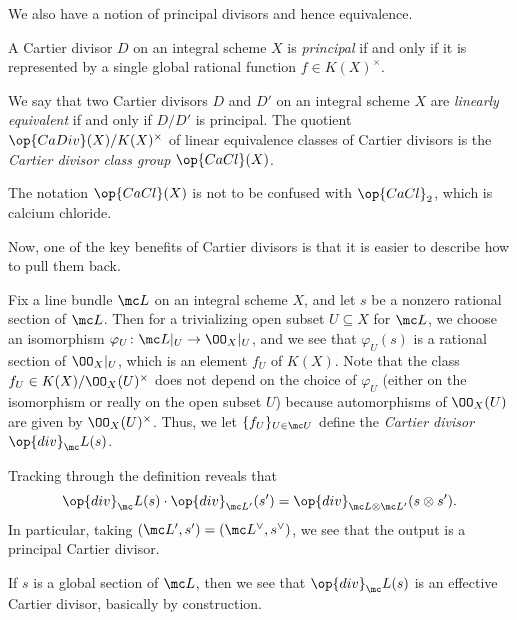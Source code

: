 \documentclass[../notes.tex]{subfiles}
\begin{document}
We also have a notion of principal divisors and hence equivalence.
\begin{defihelper}[principal] 
	A Cartier divisor $D$ on an integral scheme $X$ is \textit{principal} if and only if it is represented by a single global rational function $f\in K(X)^\times$.
\end{defihelper}
\begin{defihelper} 
	We say that two Cartier divisors $D$ and $D'$ on an integral scheme $X$ are \textit{linearly equivalent} if and only if $D/D'$ is principal. The quotient $\op{CaDiv}(X)/K(X)^\times$ of linear equivalence classes of Cartier divisors is the \textit{Cartier divisor class group} $\op{CaCl}(X)$.
\end{defihelper}
\begin{remark}[Vojta]
	The notation $\op{CaCl}(X)$ is not to be confused with $\op{CaCl}_2$, which is calcium chloride.
\end{remark}
Now, one of the key benefits of Cartier divisors is that it is easier to describe how to pull them back.
\begin{definition}
	Fix a line bundle $\mc L$ on an integral scheme $X$, and let $s$ be a nonzero rational section of $\mc L$. Then for a trivializing open subset $U\subseteq X$ for $\mc L$, we choose an isomorphism $\varphi_U\colon\mc L|_U\to\OO_X|_U$, and we see that $\varphi_U(s)$ is a rational section of $\OO_X|_U$, which is an element $f_U$ of $K(X)$. Note that the class $f_U\in K(X)/\OO_X(U)^\times$ does not depend on the choice of $\varphi_U$ (either on the isomorphism or really on the open subset $U$) because automorphisms of $\OO_X(U)$ are given by $\OO_X(U)^\times$. Thus, we let $\{f_U\}_{U\in\mc U}$ define the \textit{Cartier divisor} $\op{div}_\mc L(s)$.
\end{definition}
\begin{remark}
	Tracking through the definition reveals that
	\[\op{div}_\mc L(s)\cdot\op{div}_{\mc L'}(s')=\op{div}_{\mc L\otimes\mc L'}(s\otimes s').\]
	In particular, taking $(\mc L',s')=(\mc L^\lor,s^\lor)$, we see that the output is a principal Cartier divisor.
\end{remark}
\begin{remark}
	If $s$ is a global section of $\mc L$, then we see that $\op{div}_\mc L(s)$ is an effective Cartier divisor, basically by construction.
\end{remark}
\end{document}
